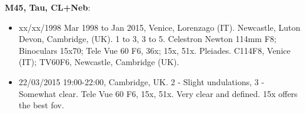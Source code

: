 {\bf M45, Tau, CL+Neb}:
\begin{itemize}
\item xx/xx/1998 Mar 1998 to Jan 2015, Venice, Lorenzago (IT). Newcastle, Luton Devon, Cambridge, (UK). 1 to 3, 3 to 5. Celestron Newton 114mm F8; Binoculars 15x70; Tele Vue 60 F6, 36x; 15x, 51x. Pleiades. C114F8, Venice (IT); TV60F6, Newcastle, Cambridge (UK).
\item 22/03/2015 19:00-22:00, Cambridge, UK. 2 - Slight undulations, 3 - Somewhat clear. Tele Vue 60 F6, 15x, 51x. Very clear and defined. 15x offers the best fov.
\end{itemize}
